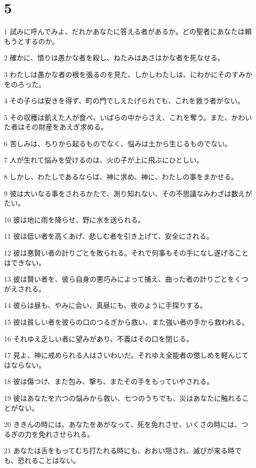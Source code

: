 \chapter{5}

\par 1 試みに呼んでみよ、だれかあなたに答える者があるか。どの聖者にあなたは頼もうとするのか。
\par 2 確かに、憤りは愚かな者を殺し、ねたみはあさはかな者を死なせる。
\par 3 わたしは愚かな者の根を張るのを見た、しかしわたしは、にわかにそのすみかをのろった。
\par 4 その子らは安きを得ず、町の門でしえたげられても、これを救う者がない。
\par 5 その収穫は飢えた人が食べ、いばらの中からさえ、これを奪う。また、かわいた者はその財産をあえぎ求める。
\par 6 苦しみは、ちりから起るものでなく、悩みは土から生じるものでない。
\par 7 人が生れて悩みを受けるのは、火の子が上に飛ぶにひとしい。
\par 8 しかし、わたしであるならば、神に求め、神に、わたしの事をまかせる。
\par 9 彼は大いなる事をされるかたで、測り知れない、その不思議なみわざは数えがたい。
\par 10 彼は地に雨を降らせ、野に水を送られる。
\par 11 彼は低い者を高くあげ、悲しむ者を引き上げて、安全にされる。
\par 12 彼は悪賢い者の計りごとを敗られる。それで何事もその手になし遂げることはできない。
\par 13 彼は賢い者を、彼ら自身の悪巧みによって捕え、曲った者の計りごとをくつがえされる。
\par 14 彼らは昼も、やみに会い、真昼にも、夜のように手探りする。
\par 15 彼は貧しい者を彼らの口のつるぎから救い、また強い者の手から救われる。
\par 16 それゆえ乏しい者に望みがあり、不義はその口を閉じる。
\par 17 見よ、神に戒められる人はさいわいだ。それゆえ全能者の懲しめを軽んじてはならない。
\par 18 彼は傷つけ、また包み、撃ち、またその手をもっていやされる。
\par 19 彼はあなたを六つの悩みから救い、七つのうちでも、災はあなたに触れることがない。
\par 20 ききんの時には、あなたをあがなって、死を免れさせ、いくさの時には、つるぎの力を免れさせられる。
\par 21 あなたは舌をもってむち打たれる時にも、おおい隠され、滅びが来る時でも、恐れることはない。
